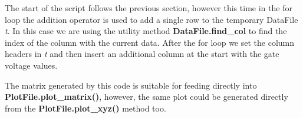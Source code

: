 \documentclass[a4paper,11pt]{scrartcl}
\begin{document}
The start of the script follows the previous section, however this time in the
for loop the addition operator is used to add a single row to the temporary
DataFile \textit{t}. In this case we are using the utility method
\textbf{DataFile.find\_col} to find the index of the column with the current
data. After the for loop we set the column headers in \textit{t} and then insert
an additional column at the start with the gate voltage values.

The matrix generated by this code is suitable for feeding directly into \textbf{PlotFile.\linebreak plot\_matrix()}, however, the same plot could be generated directly from the \linebreak\textbf{PlotFile.plot\_xyz()} method too.
\end{document}
